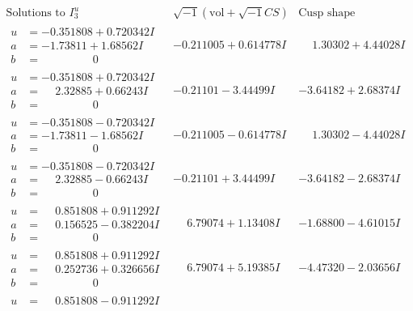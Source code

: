 \documentclass[1p]{elsarticle_modified}
\theoremstyle{definition}
\newcommand{\I}{\sqrt{-1}}
\begin{document}
$$\begin{array}{c|c|c}  
\text{Solutions to }I^u_{3}& \I (\text{vol} + \sqrt{-1}CS) & \text{Cusp shape}\\
 \hline 
\begin{aligned}
u &= -0.351808 + 0.720342 I \\
a &= -1.73811 + 1.68562 I \\
b &= \phantom{-0.000000 } 0\end{aligned}
 & -0.211005 + 0.614778 I & \phantom{-}1.30302 + 4.44028 I \\ \hline\begin{aligned}
u &= -0.351808 + 0.720342 I \\
a &= \phantom{-}2.32885 + 0.66243 I \\
b &= \phantom{-0.000000 } 0\end{aligned}
 & -0.21101 - 3.44499 I & -3.64182 + 2.68374 I \\ \hline\begin{aligned}
u &= -0.351808 - 0.720342 I \\
a &= -1.73811 - 1.68562 I \\
b &= \phantom{-0.000000 } 0\end{aligned}
 & -0.211005 - 0.614778 I & \phantom{-}1.30302 - 4.44028 I \\ \hline\begin{aligned}
u &= -0.351808 - 0.720342 I \\
a &= \phantom{-}2.32885 - 0.66243 I \\
b &= \phantom{-0.000000 } 0\end{aligned}
 & -0.21101 + 3.44499 I & -3.64182 - 2.68374 I \\ \hline\begin{aligned}
u &= \phantom{-}0.851808 + 0.911292 I \\
a &= \phantom{-}0.156525 - 0.382204 I \\
b &= \phantom{-0.000000 } 0\end{aligned}
 & \phantom{-}6.79074 + 1.13408 I & -1.68800 - 4.61015 I \\ \hline\begin{aligned}
u &= \phantom{-}0.851808 + 0.911292 I \\
a &= \phantom{-}0.252736 + 0.326656 I \\
b &= \phantom{-0.000000 } 0\end{aligned}
 & \phantom{-}6.79074 + 5.19385 I & -4.47320 - 2.03656 I \\ \hline\begin{aligned}
u &= \phantom{-}0.851808 - 0.911292 I \\

\end{aligned}
\end{array}$$
\end{document}
